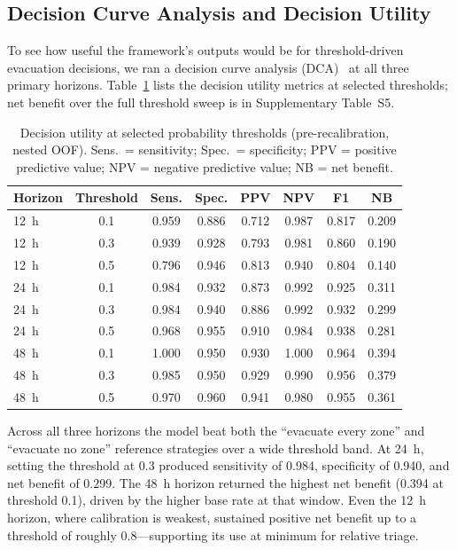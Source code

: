 \documentclass[fire,article,submit,pdftex]{../Definitions/mdpi}
\begin{document}
\subsection{Decision Curve Analysis and Decision Utility}\label{sec:dca_results}

To see how useful the framework's outputs would be for threshold-driven evacuation decisions, we ran a decision curve analysis (DCA)~\cite{Vickers2006} at all three primary horizons.
Table~\ref{tab:dca_utility} lists the decision utility metrics at selected thresholds; net benefit over the full threshold sweep is in Supplementary Table~S5.

\begin{table}[!ht]
\caption{Decision utility at selected probability thresholds (pre-recalibration, nested OOF). Sens.\ = sensitivity; Spec.\ = specificity; PPV = positive predictive value; NPV = negative predictive value; NB = net benefit.}\label{tab:dca_utility}
\small
\begin{tabular}{lccccccc}
\toprule
\textbf{Horizon} & \textbf{Threshold} & \textbf{Sens.} & \textbf{Spec.} & \textbf{PPV} & \textbf{NPV} & \textbf{F1} & \textbf{NB} \\
\midrule
12~h & 0.1 & 0.959 & 0.886 & 0.712 & 0.987 & 0.817 & 0.209 \\
12~h & 0.3 & 0.939 & 0.928 & 0.793 & 0.981 & 0.860 & 0.190 \\
12~h & 0.5 & 0.796 & 0.946 & 0.813 & 0.940 & 0.804 & 0.140 \\
\midrule
24~h & 0.1 & 0.984 & 0.932 & 0.873 & 0.992 & 0.925 & 0.311 \\
24~h & 0.3 & 0.984 & 0.940 & 0.886 & 0.992 & 0.932 & 0.299 \\
24~h & 0.5 & 0.968 & 0.955 & 0.910 & 0.984 & 0.938 & 0.281 \\
\midrule
48~h & 0.1 & 1.000 & 0.950 & 0.930 & 1.000 & 0.964 & 0.394 \\
48~h & 0.3 & 0.985 & 0.950 & 0.929 & 0.990 & 0.956 & 0.379 \\
48~h & 0.5 & 0.970 & 0.960 & 0.941 & 0.980 & 0.955 & 0.361 \\
\bottomrule
\end{tabular}
\end{table}

Across all three horizons the model beat both the ``evacuate every zone'' and ``evacuate no zone'' reference strategies over a wide threshold band.
At 24~h, setting the threshold at 0.3 produced sensitivity of 0.984, specificity of 0.940, and net benefit of 0.299.
The 48~h horizon returned the highest net benefit (0.394 at threshold 0.1), driven by the higher base rate at that window.
Even the 12~h horizon, where calibration is weakest, sustained positive net benefit up to a threshold of roughly 0.8---supporting its use at minimum for relative triage.
\end{document}
